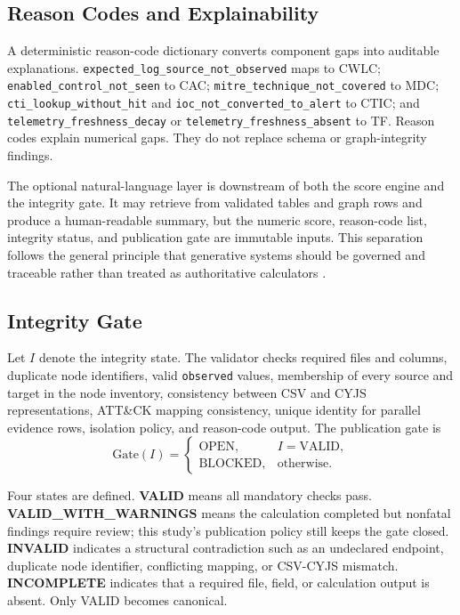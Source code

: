 \documentclass[a4paper,conference]{IEEEtran}
\begin{document}
\subsection{Reason Codes and Explainability}
A deterministic reason-code dictionary converts component gaps into auditable explanations. \texttt{expected\_log\_source\_not\_observed} maps to CWLC; \texttt{enabled\_control\_not\_seen} to CAC; \texttt{mitre\_technique\_not\_covered} to MDC; \texttt{cti\_lookup\_without\_hit} and \texttt{ioc\_not\_converted\_to\_alert} to CTIC; and \texttt{telemetry\_freshness\_decay} or \texttt{telemetry\_freshness\_absent} to TF. Reason codes explain numerical gaps. They do not replace schema or graph-integrity findings.

The optional natural-language layer is downstream of both the score engine and the integrity gate. It may retrieve from validated tables and graph rows and produce a human-readable summary, but the numeric score, reason-code list, integrity status, and publication gate are immutable inputs. This separation follows the general principle that generative systems should be governed and traceable rather than treated as authoritative calculators \cite{nist_airmf,nist_genai,lewis2020}.

\subsection{Integrity Gate}
Let $I$ denote the integrity state. The validator checks required files and columns, duplicate node identifiers, valid \texttt{observed} values, membership of every source and target in the node inventory, consistency between CSV and CYJS representations, ATT\&CK mapping consistency, unique identity for parallel evidence rows, isolation policy, and reason-code output. The publication gate is
\begin{equation}
\mathrm{Gate}(I)=
\begin{cases}
\mathrm{OPEN}, & I=\mathrm{VALID},\\
\mathrm{BLOCKED}, & \text{otherwise}.
\end{cases}
\label{eq:gate}
\end{equation}

Four states are defined. \textbf{VALID} means all mandatory checks pass. \textbf{VALID\_WITH\_WARNINGS} means the calculation completed but nonfatal findings require review; this study's publication policy still keeps the gate closed. \textbf{INVALID} indicates a structural contradiction such as an undeclared endpoint, duplicate node identifier, conflicting mapping, or CSV-CYJS mismatch. \textbf{INCOMPLETE} indicates that a required file, field, or calculation output is absent. Only VALID becomes canonical.
\end{document}
